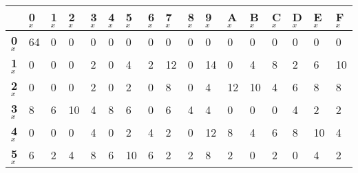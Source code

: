 \begin{longtable}[c]{|l|l|l|l|l|l|l|l|l|l|l|l|l|l|l|l|l|}
\hline
                & \textbf{0$_x$} & \textbf{1$_x$} & \textbf{2$_x$} & \textbf{3$_x$} & \textbf{4$_x$} & \textbf{5$_x$} & \textbf{6$_x$} & \textbf{7$_x$} & \textbf{8$_x$} & \textbf{9$_x$} & \textbf{A$_x$} & \textbf{B$_x$} & \textbf{C$_x$} & \textbf{D$_x$} & \textbf{E$_x$} & \textbf{F$_x$} \\ \hline
\endfirsthead
%
\endhead
%
\textbf{0$_x$}  & 64             & 0              & 0              & 0              & 0              & 0              & 0              & 0              & 0              & 0              & 0              & 0              & 0              & 0              & 0              & 0              \\ \hline
\textbf{1$_x$}  & 0              & 0              & 0              & 2              & 0              & 4              & 2              & 12             & 0              & 14             & 0              & 4              & 8              & 2              & 6              & 10             \\ \hline
\textbf{2$_x$}  & 0              & 0              & 0              & 2              & 0              & 2              & 0              & 8              & 0              & 4              & 12             & 10             & 4              & 6              & 8              & 8              \\ \hline
\textbf{3$_x$}  & 8              & 6              & 10             & 4              & 8              & 6              & 0              & 6              & 4              & 4              & 0              & 0              & 0              & 4              & 2              & 2              \\ \hline
\textbf{4$_x$}  & 0              & 0              & 0              & 4              & 0              & 2              & 4              & 2              & 0              & 12             & 8              & 4              & 6              & 8              & 10             & 4              \\ \hline
\textbf{5$_x$}  & 6              & 2              & 4              & 8              & 6              & 10             & 6              & 2              & 2              & 8              & 2              & 0              & 2              & 0              & 4              & 2              \\ \hline

\end{longtable}
